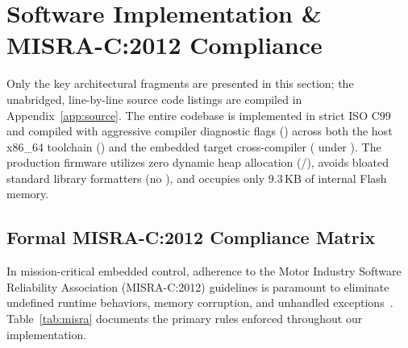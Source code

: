 \section{Software Implementation \& MISRA-C:2012 Compliance}
\label{sec:impl}

Only the key architectural fragments are presented in this section; the unabridged, line-by-line
source code listings are compiled in Appendix~\ref{app:source}. The entire codebase is implemented in
strict ISO C99 and compiled with aggressive compiler diagnostic flags ()
across both the host x86\_64 toolchain () and the embedded target cross-compiler
( under ). The production firmware utilizes zero dynamic heap
allocation (/), avoids bloated standard library formatters (no ),
and occupies only $9.3\,\text{KB}$ of internal Flash memory.

\subsection{Formal MISRA-C:2012 Compliance Matrix}
\label{sec:misra}

In mission-critical embedded control, adherence to the Motor Industry Software Reliability Association
(MISRA-C:2012) guidelines is paramount to eliminate undefined runtime behaviors, memory corruption,
and unhandled exceptions~\cite{misra2012}. Table~\ref{tab:misra} documents the primary rules enforced
throughout our implementation.

